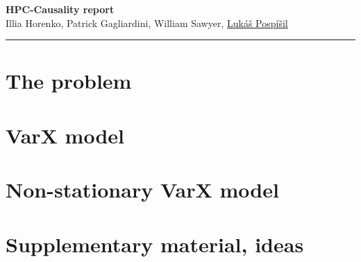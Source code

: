 \documentclass{article}
\newcommand{\MakeTitlePage}
{
  \begin{center}
    \vspace{10mm}
    \sffamily
    {\huge\bfseries
    {HPC-Causality report}\\
    }
    \bigskip
    \bigskip
    {\large
	 \vspace{0.5cm}
	 {Illia Horenko, Patrick Gagliardini, William Sawyer, \underline{Luk\'{a}\v{s} Posp\'{i}\v{s}il}}	
    }
  \end{center}
  \vspace{10mm}
  \hrule
}
\begin{document}
 \MakeTitlePage
 \tableofcontents
 \newpage

 \section {The problem}
 
 
 \section {VarX model}
 
 
 \section {Non-stationary VarX model}
 

 \section {Supplementary material, ideas}
 
\end{document}
